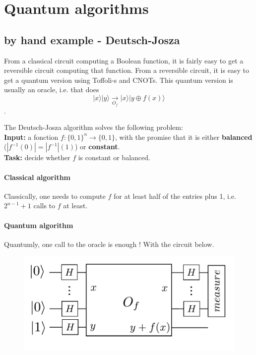 \documentclass{article}
\begin{document}
\section{Quantum algorithms}

\subsection{by hand example - Deutsch-Josza}

From a classical circuit computing a Boolean function, it is fairly easy to get a reversible 
circuit computing that function. From a reversible circuit, it is easy to get a quantum 
version using Toffoli-s and CNOTs. This quantum version is usually an oracle, i.e. that does
$$|x\rangle|y\rangle\xrightarrow[O_f]{}|x\rangle|y\oplus f(x)\rangle$$.

The Deutsch-Josza algorithm solves the following problem:\\
\textbf{Input:} a fonction $f:\{0,1\}^{n}\rightarrow \{0,1\}$,
with the promise that it is either \textbf{balanced} ($|f^{-1}(0)|=|f^{-1}|(1)$) or
\textbf{constant}.\\
\textbf{Task:} decide whether $f$ is constant or balanced.

\paragraph{Classical algorithm} Classically, one needs to compute $f$ for at least
half of the entries plus 1, i.e. $2^{n-1}+1$ calls to $f$ at least.

\paragraph{Quantum algorithm} Quantumly, one call to the oracle is enough ! With
the circuit below.

\begin{center}
\begin{figure}
\includegraphics[width=.6\textwidth]{deutsch_josza.pdf}
\end{figure}
\end{center}
\end{document}
